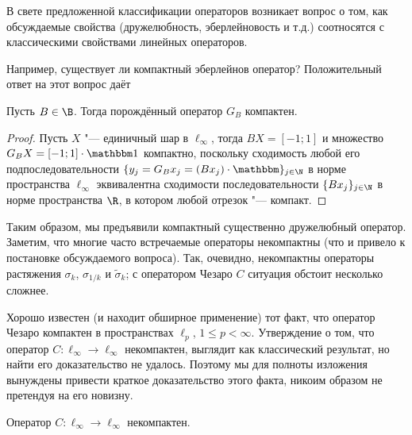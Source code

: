 В свете предложенной классификации операторов возникает вопрос о том,
как обсуждаемые свойства (дружелюбность, эберлейновость и т.д.)
соотносятся с классическими свойствами линейных операторов.

Например, существует ли компактный эберлейнов оператор?
Положительный ответ на этот вопрос даёт

\begin{theorem}
	Пусть $B\in\B$.
	Тогда порождённый оператор $G_B$ компактен.
\end{theorem}

\begin{proof}
	Пусть $X$ "--- единичный шар в $\ell_\infty$,
	тогда $BX = [-1;1]$
	и множество $G_B X = [-1;1] \cdot \mathbbm 1$
	компактно,
	поскольку сходимость любой его подпоследовательности $\{y_j = G_B x_j = (Bx_j) \cdot \mathbbm\}_{j\in\N}$
	в норме пространства $\ell_\infty$ эквивалентна сходимости последовательности
	$\{Bx_j\}_{j\in\N}$ в норме пространства $\R$,
	в котором любой отрезок "--- компакт.
\end{proof}

Таким образом, мы предъявили компактный существенно дружелюбный оператор.
Заметим, что многие часто встречаемые операторы некомпактны
(что и привело к постановке обсуждаемого вопроса).
Так, очевидно, некомпактны операторы растяжения $\sigma_k$, $\sigma_{1/k}$ и $\tilde\sigma_k$;
с оператором Чезаро $C$ ситуация обстоит несколько сложнее.

Хорошо известен (и находит обширное применение)
тот факт, что оператор Чезаро компактен в пространствах $\ell_p$, $1\leq p < \infty$.
Утверждение о том, что оператор $C:\ell_\infty\to\ell_\infty$ некомпактен,
выглядит как классический результат, но найти его доказательство не удалось.
Поэтому мы для полноты изложения вынуждены привести краткое доказательство этого факта,
никоим образом не претендуя на его новизну.

\begin{lemma}
	Оператор $C:\ell_\infty\to\ell_\infty$ некомпактен.
\end{lemma}

